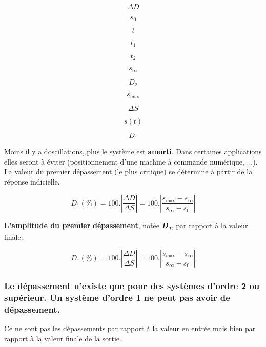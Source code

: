 \[\Delta D\]

\[s_{0}\]

\[t\]

\[t_{1}\]

\[t_{2}\]

\[s_{\infty}\]

\[D_{2}\]

\[s_{\max}\]

\[\Delta S\]

\[s(t)\]

\[D_{1}\]

Moins il y a d\textquotesingle oscillations, plus le système est
\textbf{amorti}. Dans certaines applications elles seront à éviter
(positionnement d'une machine à commande numérique, ...). La valeur du
premier dépassement (le plus critique) se détermine à partir de la
réponse indicielle.

\[D_{1}(\%) = 100.\left| \frac{\Delta D}{\Delta S} \right| = 100.\left| \frac{s_{\max} - s_{\infty}}{s_{\infty} - s_{0}} \right|\]

\textbf{L'amplitude du premier} \textbf{dépassement}, notée
\emph{\textbf{D\textsubscript{1}}}, par rapport à la valeur finale:

\[D_{1}(\%) = 100.\left| \frac{\Delta D}{\Delta S} \right| = 100.\left| \frac{s_{\max} - s_{\infty}}{s_{\infty} - s_{0}} \right|\]

\subsubsection{}\label{section-1}

\subsubsection{ Le dépassement n'existe que pour des systèmes d'ordre 2 ou supérieur. Un système d'ordre 1 ne peut pas avoir de dépassement.}\label{le-duxe9passement-nexiste-que-pour-des-systuxe8mes-dordre-2-ou-supuxe9rieur.-un-systuxe8me-dordre-1-ne-peut-pas-avoir-de-duxe9passement.}

Ce ne sont pas les dépassements par rapport à la valeur en entrée mais
bien par rapport à la valeur finale de la sortie.

